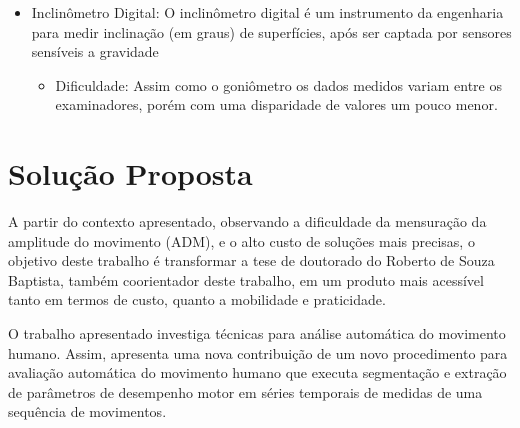 \begin{itemize}
\item Inclinômetro Digital: O inclinômetro digital é um instrumento da 
engenharia para medir inclinação (em graus) de superfícies, após ser captada 
por sensores sensíveis a gravidade\cite{erroMedicao2012}
  \begin{itemize}
  \item Dificuldade: Assim como o goniômetro os dados medidos variam entre os 
  examinadores, porém com uma disparidade de valores um pouco menor.
  \end{itemize}

\end{itemize}
                                                                                  
\section{Solução Proposta}                                                      
\label{Sec:SolucaoProposta}
  A partir do contexto apresentado, observando a dificuldade da mensuração da 
amplitude do movimento (ADM), e o alto custo de soluções mais precisas, o 
objetivo deste trabalho é transformar a tese de doutorado do Roberto de Souza 
Baptista, também coorientador deste trabalho, em um produto mais acessível 
tanto em termos de custo, quanto a mobilidade e praticidade.
                                                            
  O trabalho apresentado investiga técnicas para análise automática do
movimento humano. Assim, apresenta uma nova contribuição de um novo 
procedimento para avaliação automática do movimento humano que executa 
segmentação e extração de parâmetros de desempenho motor em séries temporais 
de medidas de uma sequência de movimentos.
  
